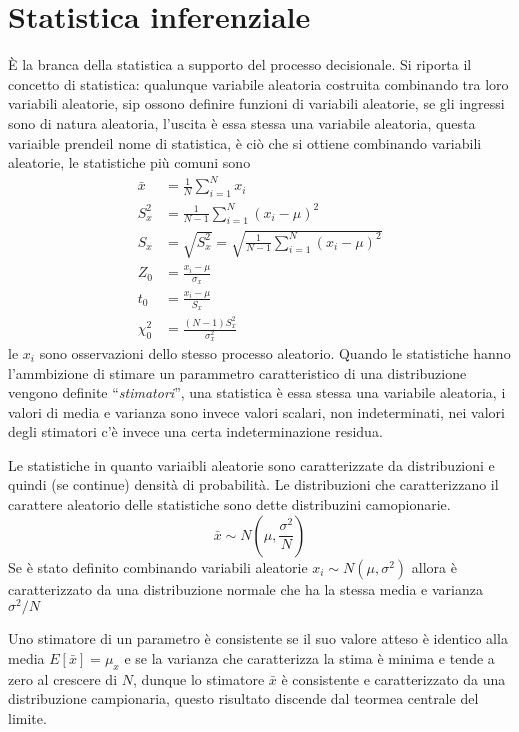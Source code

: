 \chapter{Statistica inferenziale}
È la branca della statistica a supporto del processo decisionale. Si riporta il 
concetto di statistica: qualunque variabile aleatoria costruita combinando tra 
loro variabili aleatorie, sip ossono definire funzioni di variabili aleatorie, 
se gli ingressi sono di natura aleatoria, l'uscita è essa stessa una variabile 
aleatoria, questa variaible prendeil nome di statistica, è ciò che si ottiene 
combinando variabili aleatorie, le statistiche più comuni sono
$$\begin{aligned}
\bar{x} &= \frac{1}{N} \sum_{i=1}^{N}x_i \\
S^2_x & = \frac{1}{N-1} \sum_{i=1}^N(x_i-\mu)^2 \\
S_x &= \sqrt{S^2_x} = \sqrt{\frac{1}{N-1} \sum_{i=1}^N(x_i-\mu)^2} \\
Z_0 &= \frac{x_i-\mu}{\sigma_x} \\
t_0 &= \frac{x_i -\mu}{S_x} \\
\chi_0^2 &= \frac{(N-1)S_x^2}{\sigma_x^2}
\end{aligned}
$$
le $x_i$ sono osservazioni dello stesso processo aleatorio.
Quando le statistiche hanno l'ammbizione di stimare un parammetro 
caratteristico di una distribuzione vengono definite ``\textit{stimatori}'', 
una statistica è essa stessa una variabile aleatoria, i valori di media e 
varianza sono invece valori scalari, non indeterminati, nei valori degli 
stimatori c'è invece una certa indeterminazione residua.

Le statistiche in quanto variaibli aleatorie sono caratterizzate da 
distribuzioni e quindi (se continue) densità di probabilità. Le distribuzioni 
che caratterizzano il carattere aleatorio delle statistiche sono dette 
distribuzini camopionarie.
$$
\bar{x} \sim N (\mu, \frac{\sigma^2}{N})
$$
Se è stato definito combinando variabili aleatorie $x_i\sim N(\mu,\sigma^2)$ 
allora è caratterizzato da una distribuzione normale che ha la stessa media e 
varianza $\sigma^2/N$

Uno stimatore di un parametro è consistente se il suo valore atteso è identico 
alla media $E[\bar{x}] = \mu_x$ e se la varianza che caratterizza la stima è 
minima e tende a zero al crescere di $N$, dunque lo stimatore $\bar{x}$ è 
consistente e caratterizzato da una distribuzione campionaria, questo risultato 
discende dal teormea centrale del limite.

